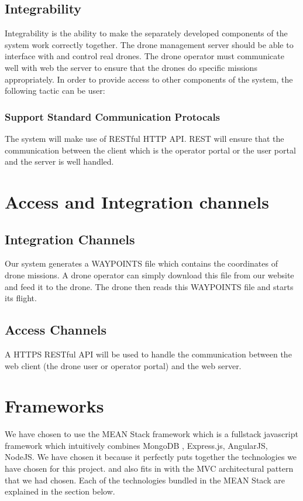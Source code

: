 \documentclass{article}
\begin{document}
	\subsection{Integrability}
	Integrability is the ability to make the separately developed components of the system work correctly together. The drone management server should be able to interface with and control real drones. The drone operator must communicate well with web the server to ensure that the drones do specific missions appropriately. In order to provide access to other components of the system, the following tactic can be user:
	
	\subsubsection{Support Standard Communication Protocals}
	The system will make use of RESTful HTTP API.
	REST will ensure that the communication between the client which is the operator portal or the user portal and the server is well handled.
	
	\section{Access and Integration channels}%
	\subsection{Integration Channels}
	Our system generates a WAYPOINTS file which contains the coordinates of drone missions. A drone operator can simply download this file from our website and feed it to the drone. The drone then reads this WAYPOINTS file and starts its flight.
	\subsection{Access Channels}
	A HTTPS RESTful API will be used to handle the communication between the web client (the drone user or operator portal) and the web server. 
	
	\section{Frameworks}
	We have chosen to use the MEAN Stack framework which is a fullstack javascript framework which intuitively combines MongoDB , Express.js, AngularJS, NodeJS. We have chosen it because it perfectly puts together the technologies we have chosen for this project. and also fits in with the MVC architectural pattern that we had chosen. Each of the technologies bundled in the MEAN Stack are explained in the section below.
	
\end{document}
